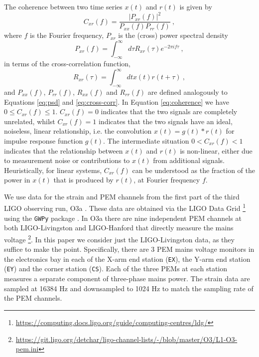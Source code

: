 \documentclass[pra,superscriptaddress,reprint,amsmath,amssymb,nofootinbib]{revtex4-2}
\providecommand{\DIFaddtex}[1]{{\protect\color{blue}\uwave{#1}}} %
\providecommand{\DIFaddbegin}{} %
\providecommand{\DIFaddend}{} %
\providecommand{\DIFadd}[1]{\texorpdfstring{\DIFaddtex{#1}}{#1}} %
\newcommand{\DIFaddincludegraphics}[2][]{{\color{blue}\fbox{\DIFOincludegraphics[#1]{#2}}}} %
\DeclareRobustCommand{\DIFaddbegin}{\DIFOaddbegin \let\includegraphics\DIFaddincludegraphics} %
\DeclareRobustCommand{\DIFaddend}{\DIFOaddend \let\includegraphics\DIFOincludegraphics} %
\begin{document}
The coherence between two time series $x(t)$ and $r(t)$ is given by 
\begin{equation}
	C_{xr}(f)	= \frac{|P_{xr}(f)|^2}{P_{xx}(f) P_{rr}(f)} \ , \label{eq:coherence}
\end{equation}
where $f$ is the Fourier frequency, $P_{xr}$ is the (cross) power spectral density
\begin{equation}
	P_{xr}(f)	= \int_{-\infty}^{\infty} d \tau R_{xr}(\tau) e^{-2 \pi i f \tau }  \ ,    \label{eq:psd}
\end{equation}
in terms of the cross-correlation function,
\begin{equation}
	R_{xr}(\tau) = \int_{-\infty}^{\infty} dt x(t) r(t+ \tau)  \ ,  \label{eq:cross-corr}
\end{equation}
and $P_{xx}(f)$, $P_{rr}(f)$, $R_{xx}(f)$ and $R_{rr}(f)$ are defined analogously to Equations \eqref{eq:psd} and \eqref{eq:cross-corr}. In Equation \eqref{eq:coherence} we have $0 \leq C_{xr}(f) \leq 1$. $C_{xr}(f) = 0$ indicates that the two signals are completely unrelated, whilst $C_{xr}(f) = 1$ indicates that the two signals have an ideal, noiseless, linear relationship, i.e. the convolution $x(t) = g(t) \ast r(t)$ for impulse response function $g(t)$.  The intermediate situation $ 0 < C_{xr}(f) < 1$ indicates that the relationship between $x(t)$ and $r(t)$ is non-linear, either due to measurement noise or contributions to $x(t)$ from additional signals. Heuristically, for linear systems, $C_{xr}(f)$ can be understood as the fraction of the power in $x(t)$ that is produced by $r(t)$, at Fourier frequency $f$. \newline 


We use data for the strain and PEM channels from the first part of the third LIGO observing run, O3a \cite{LIGO_O3}. These data are obtained via the LIGO Data Grid  \footnote{\url{https://computing.docs.ligo.org/guide/computing-centres/ldg/}} using the \texttt{GWPy} package \cite{gwpy}. In O3a there are nine independent PEM channels at both LIGO-Livingston and LIGO-Hanford that directly measure the mains voltage \footnote{\url{https://git.ligo.org/detchar/ligo-channel-lists/-/blob/master/O3/L1-O3-pem.ini}\DIFaddbegin \DIFadd{. See also \mbox{%
\cite{pemrefs}}\hskip0pt%
.}\DIFaddend }. In this paper we consider just the LIGO-Livingston data, as they suffice to make the point. Specifically, there are 3 PEM mains voltage monitors in the electronics bay in each of the X-arm end station (\texttt{EX}), the Y-arm end station (\texttt{EY}) and the corner station (\texttt{CS}). Each of the three PEMs at each station measures a separate component of three-phase mains power. The strain data are sampled at 16384 Hz and downsampled to 1024 Hz to match the sampling rate of the PEM channels. \newline 
\end{document}
